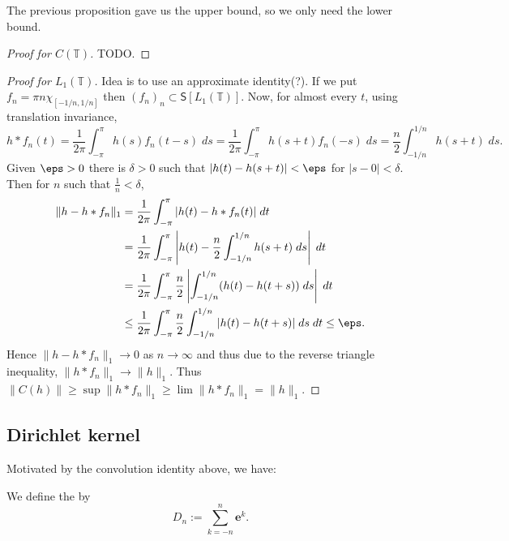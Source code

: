 The previous proposition gave us the upper bound, so we only need the lower bound.

\begin{proof}[Proof for $C(\mathbb{T})$]
TODO.
\end{proof}

\begin{proof}[Proof for $L_1(\mathbb{T})$]
Idea is to use an approximate identity(?). If we put $f_n = \pi n \chi_{[-1/n,1/n]}$ then $(f_n)_n \subset \mathsf{S}[L_1(\mathbb{T})]$. Now, for almost every $t$, using translation invariance,
\[ h * f_n(t) = \frac{1}{2 \pi} \int_{-\pi}^\pi h(s) f_n(t-s) \; ds = \frac{1}{2\pi} \int_{-\pi}^\pi h(s+t) f_n(-s) \; ds = \frac{n}{2} \int_{-1/n}^{1/n} h(s+t) \; ds. \]
Given $\eps > 0$ there is $\delta > 0$ such that $|h(t) - h(s+t)| < \eps$ for $|s-0| < \delta$. Then for $n$ such that $\tfrac{1}{n} < \delta$,
\begin{align*}
\| h - h * f_n \|_1 & = \frac{1}{2\pi} \int_{-\pi}^{\pi} |h(t) - h * f_n(t)| \; dt \\
& = \frac{1}{2\pi} \int_{-\pi}^{\pi} \left| h(t) - \frac{n}{2} \int_{-1/n}^{1/n} h(s+t) \; ds \right| \; dt \\
& = \frac{1}{2\pi} \int_{-\pi}^{\pi} \frac{n}{2} \left| \int_{-1/n}^{1/n} (h(t) - h(t+s)) \; ds \right| \; dt \\
& \leq \frac{1}{2\pi} \int_{-\pi}^{\pi} \frac{n}{2} \int_{-1/n}^{1/n} |h(t) - h(t+s)| \; ds \; dt \leq \eps.
\end{align*}
Hence $\| h - h * f_n \|_1 \to 0$ as $n \to \infty$ and thus due to the reverse triangle inequality, $\| h * f_n \|_1 \to \| h \|_1$.
Thus $\| C(h) \| \geq \sup \| h * f_n \|_1 \geq \lim \| h * f_n \|_1 = \| h \|_1$.
\end{proof}

\subsection{Dirichlet kernel}


Motivated by the convolution identity above, we have:

\begin{definition}
We define the  by
\[ D_n := \sum_{k=-n}^n \mathbf{e}^k. \]
\end{definition}

